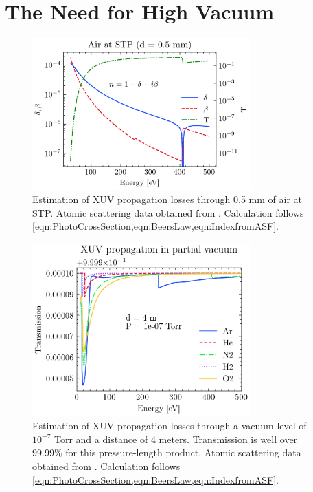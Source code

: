 \section{The Need for High Vacuum}
\begin{figure}
	\centering
	\includegraphics[width=0.75\textwidth]{figures/chap2/AirAbs.png}
	\caption{Estimation of XUV propagation losses through 0.5 mm of air at STP. Atomic scattering data obtained from \cite{gulliksonCXROXRayInteractions,henkeXRayInteractionsPhotoabsorption1993}. Calculation follows \cref{eqn:PhotoCrossSection,eqn:BeersLaw,eqn:IndexfromASF}.}
	\label{fig:AirAbs}
\end{figure}

\begin{figure}
	\centering
	\includegraphics[width=0.75\textwidth]{figures/chap2/XUVinVacuum.png}
	\caption{Estimation of XUV propagation losses through a vacuum level of $10^{-7}$ Torr and a distance of 4 meters. Transmission is well over 99.99\% for this pressure-length product. Atomic scattering data obtained from \cite{gulliksonCXROXRayInteractions,henkeXRayInteractionsPhotoabsorption1993}. Calculation follows \cref{eqn:PhotoCrossSection,eqn:BeersLaw,eqn:IndexfromASF}.}
	\label{fig:XUVinVacuum}
\end{figure}


